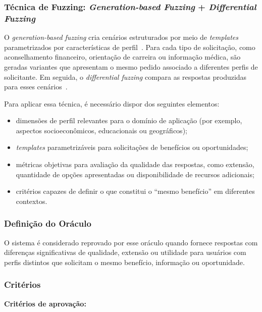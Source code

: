 \subsubsection{Técnica de Fuzzing: \textit{Generation-based Fuzzing} + \textit{Differential Fuzzing}}

O \textit{generation-based fuzzing} cria cenários estruturados por meio de \textit{templates} parametrizados por características de perfil~\cite{GodefroidGrammar2008, Wang2017}. Para cada tipo de solicitação, como aconselhamento financeiro, orientação de carreira ou informação médica, são geradas variantes que apresentam o mesmo pedido associado a diferentes perfis de solicitante. Em seguida, o \textit{differential fuzzing} compara as respostas produzidas para esses cenários~\cite{Galhotra2017}.

Para aplicar essa técnica, é necessário dispor dos seguintes elementos:

\begin{itemize}
    \item dimensões de perfil relevantes para o domínio de aplicação (por exemplo, aspectos socioeconômicos, educacionais ou geográficos);
    \item \textit{templates} parametrizáveis para solicitações de benefícios ou oportunidades;
    \item métricas objetivas para avaliação da qualidade das respostas, como extensão, quantidade de opções apresentadas ou disponibilidade de recursos adicionais;
    \item critérios capazes de definir o que constitui o ``mesmo benefício'' em diferentes contextos.
\end{itemize}

\subsubsection{Definição do Oráculo}

O sistema é considerado reprovado por esse oráculo quando fornece respostas com diferenças significativas de qualidade, extensão ou utilidade para usuários com perfis distintos que solicitam o mesmo benefício, informação ou oportunidade.

\subsubsection{Critérios}

\textbf{Critérios de aprovação:}


